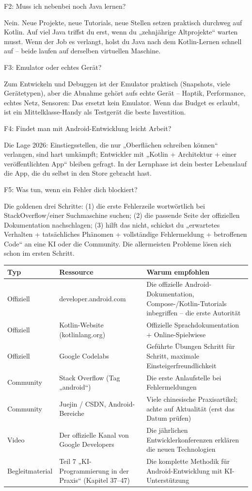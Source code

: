 F2: Muss ich nebenbei noch Java lernen?

Nein. Neue Projekte, neue Tutorials, neue Stellen setzen praktisch durchweg auf Kotlin. Auf viel Java triffst du erst, wenn du „zehnjährige Altprojekte“ warten musst. Wenn der Job es verlangt, holst du Java nach dem Kotlin-Lernen schnell auf – beide laufen auf derselben virtuellen Maschine.

F3: Emulator oder echtes Gerät?

Zum Entwickeln und Debuggen ist der Emulator praktisch (Snapshots, viele Gerätetypen), aber die Abnahme gehört aufs echte Gerät – Haptik, Performance, echtes Netz, Sensoren: Das ersetzt kein Emulator. Wenn das Budget es erlaubt, ist ein Mittelklasse-Handy als Testgerät die beste Investition.

F4: Findet man mit Android-Entwicklung leicht Arbeit?

Die Lage 2026: Einstiegsstellen, die nur „Oberflächen schreiben können“ verlangen, sind hart umkämpft; Entwickler mit „Kotlin + Architektur + einer veröffentlichten App“ bleiben gefragt. In der Lernphase ist dein bester Lebenslauf die App, die du selbst in den Store gebracht hast.

F5: Was tun, wenn ein Fehler dich blockiert?

Die goldenen drei Schritte: (1) die erste Fehlerzeile wortwörtlich bei StackOverflow/einer Suchmaschine suchen; (2) die passende Seite der offiziellen Dokumentation nachschlagen; (3) hilft das nicht, schickst du „erwartetes Verhalten + tatsächliches Phänomen + vollständige Fehlermeldung + betroffenen Code“ an eine KI oder die Community. Die allermeisten Probleme lösen sich schon im ersten Schritt.


\begin{center}
\begin{tabularx}{\linewidth}{|X|X|X|}
\hline
\textbf{Typ} & \textbf{Ressource} & \textbf{Warum empfohlen} \tabularnewline
\hline
Offiziell & developer.android.com & Die offizielle Android-Dokumentation, Compose-/Kotlin-Tutorials inbegriffen – die erste Autorität \tabularnewline
Offiziell & Kotlin-Website (kotlinlang.org) & Offizielle Sprachdokumentation + Online-Spielwiese \tabularnewline
Offiziell & Google Codelabs & Geführte Übungen Schritt für Schritt, maximale Einsteigerfreundlichkeit \tabularnewline
Community & Stack Overflow (Tag „android“) & Die erste Anlaufstelle bei Fehlermeldungen \tabularnewline
Community & Juejin / CSDN, Android-Bereiche & Viele chinesische Praxisartikel; achte auf Aktualität (erst das Datum prüfen) \tabularnewline
Video & Der offizielle Kanal von Google Developers & Die jährlichen Entwicklerkonferenzen erklären die neuen Technologien \tabularnewline
Begleitmaterial & Teil 7 „KI-Programmierung in der Praxis“ (Kapitel 37–47) & Die komplette Methodik für Android-Entwicklung mit KI-Unterstützung \tabularnewline
\hline
\end{tabularx}
\end{center}


